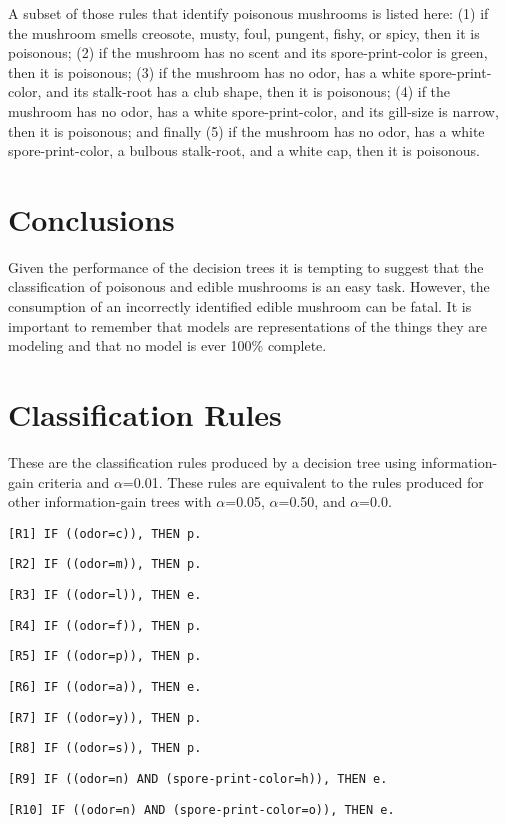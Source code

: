\documentclass{IEEEtran}
\begin{document}
A subset of those rules that identify poisonous mushrooms is listed
here: (1) if the mushroom smells creosote, musty, foul, pungent,
fishy, or spicy, then it is poisonous; (2) if the mushroom has no
scent and its spore-print-color is green, then it is poisonous; (3) if
the mushroom has no odor, has a white spore-print-color, and its
stalk-root has a club shape, then it is poisonous; (4) if the mushroom
has no odor, has a white spore-print-color, and its gill-size is
narrow, then it is poisonous; and finally (5) if the mushroom has no
odor, has a white spore-print-color, a bulbous stalk-root, and a white
cap, then it is poisonous. 


\section{Conclusions}
Given the performance of the decision trees it is tempting to suggest
that the classification of poisonous and edible mushrooms is an easy
task. However, the consumption of an incorrectly identified edible
mushroom can be fatal. It is important to remember that models are
representations of the things they are modeling and that no model is
ever 100\% complete. 

\printbibliography

\newpage
\onecolumn
\appendix
\section{ Classification Rules}
These are the classification rules produced by a decision tree using
information-gain criteria and $\alpha$=0.01. These rules are equivalent to
the rules produced for other information-gain trees with $\alpha$=0.05,
$\alpha$=0.50, and $\alpha$=0.0.

\texttt{[R1] IF ((odor=c)), THEN p.}

\texttt{[R2] IF ((odor=m)), THEN p.}

\texttt{[R3] IF ((odor=l)), THEN e.}

\texttt{[R4] IF ((odor=f)), THEN p.}

\texttt{[R5] IF ((odor=p)), THEN p.}

\texttt{[R6] IF ((odor=a)), THEN e.}

\texttt{[R7] IF ((odor=y)), THEN p.}

\texttt{[R8] IF ((odor=s)), THEN p.}

\texttt{[R9] IF ((odor=n) AND (spore-print-color=h)), THEN e.}

\texttt{[R10] IF ((odor=n) AND (spore-print-color=o)), THEN e.}
\end{document}
